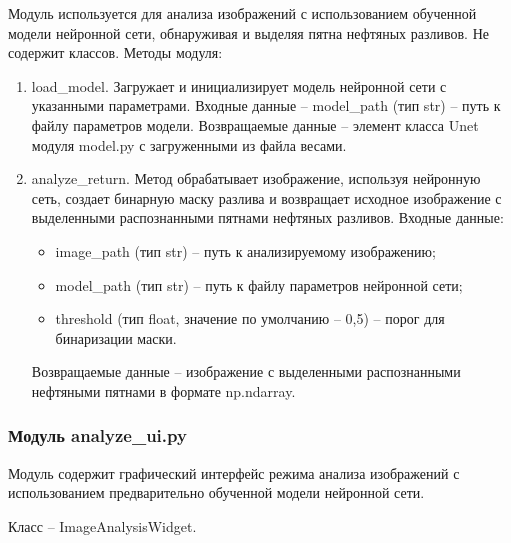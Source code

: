Модуль используется для анализа изображений с использованием обученной модели нейронной сети, обнаруживая и выделяя пятна нефтяных разливов.  Не содержит классов. Методы модуля:
\begin{enumerate}
	\item load\_model. Загружает и инициализирует модель нейронной сети с указанными параметрами. Входные данные -- model\_path (тип str) -- путь к файлу параметров модели. Возвращаемые данные -- элемент класса Unet модуля model.py с загруженными из файла весами.
	\item analyze\_return. Метод обрабатывает изображение, используя нейронную сеть, создает бинарную маску разлива и возвращает исходное изображение с выделенными распознанными пятнами нефтяных разливов. Входные данные:
	\begin{itemize}
		\item image\_path (тип str) -- путь к анализируемому изображению;
		\item model\_path (тип str) -- путь к файлу параметров нейронной сети;
		\item threshold (тип float, значение по умолчанию -- 0,5) -- порог для бинаризации маски.
	\end{itemize}
	Возвращаемые данные -- изображение с выделенными распознанными нефтяными пятнами в формате np.ndarray.
\end{enumerate}

\subsubsection{Модуль analyze\_ui.py}

Модуль содержит графический интерфейс режима анализа изображений с использованием предварительно обученной модели нейронной сети.

Класс -- ImageAnalysisWidget. 

